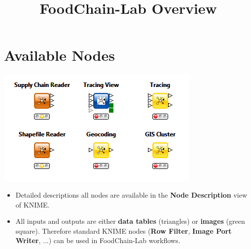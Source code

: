 \documentclass{beamer}
\title{FoodChain-Lab Overview}
\date{}
\begin{document}
\maketitle

\section{Available Nodes}
\begin{frame}
	\begin{center}
  		\includegraphics[height=0.4\textheight]{1.png}
	\end{center}
	\begin{itemize}
		\item Detailed descriptions all nodes are available in the \textbf{Node Description} view of KNIME.
		\item All inputs and outputs are either \textbf{data tables} (triangles) or \textbf{images} (green square). Therefore standard KNIME nodes (\textbf{Row Filter}, \textbf{Image Port Writer}, ...) can be used in FoodChain-Lab workflows.		
	\end{itemize}
\end{frame}
 
\end{document}
